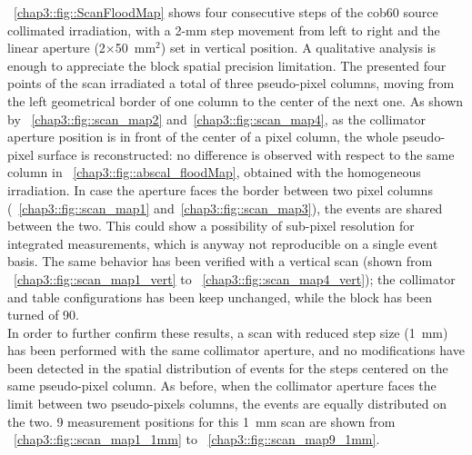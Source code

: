 \figurename~\ref{chap3::fig::ScanFloodMap} shows four consecutive steps of the \gls{cob60} source collimated irradiation, with a 2-mm step movement from left to right and the linear aperture (2$\times$50~mm$^2$) set in vertical position. A qualitative analysis is enough to appreciate the block spatial precision limitation. The presented four points of the scan irradiated a total of three pseudo-pixel columns, moving from the left geometrical border of one column to the center of the next one. As shown by \figurename~\ref{chap3::fig::scan_map2} and~\ref{chap3::fig::scan_map4}, as the collimator aperture position is in front of the center of a pixel column, the whole pseudo-pixel surface is reconstructed: no difference is observed with respect to the same column in \figurename~\ref{chap3::fig::abscal_floodMap}, obtained with the homogeneous irradiation. In case the aperture faces the border between two pixel columns (\figurename~\ref{chap3::fig::scan_map1} and~\ref{chap3::fig::scan_map3}), the events are shared between the two. This could show a possibility of sub-pixel resolution for integrated measurements, which is anyway not reproducible on a single event basis. The same behavior has been verified with a vertical scan (shown from \figurename~\ref{chap3::fig::scan_map1_vert} to \figurename~\ref{chap3::fig::scan_map4_vert}); the collimator and table configurations has been keep unchanged, while the block has been turned of 90\textdegree.\\ 
In order to further confirm these results, a scan with reduced step size (1~mm) has been performed with the same collimator aperture, and no modifications have been detected in the spatial distribution of events for the steps centered on the same pseudo-pixel column. As before, when the collimator aperture faces the limit between two pseudo-pixels columns, the events are equally distributed on the two. 9 measurement positions for this 1~mm scan are shown from \figurename~\ref{chap3::fig::scan_map1_1mm} to \figurename~\ref{chap3::fig::scan_map9_1mm}.\\ 

